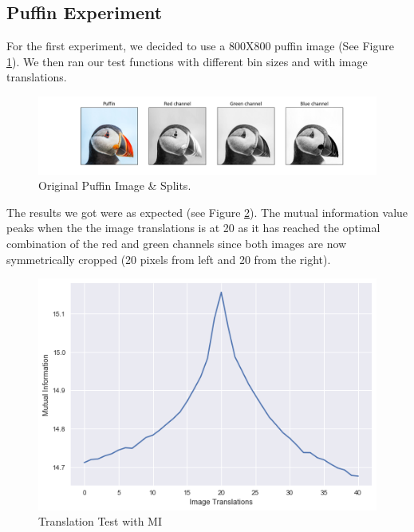\documentclass{article}
\begin{document}

\subsection{Puffin Experiment}
\vspace{2mm}

\begin{flushleft}
For the first experiment, we decided to use a 800X800 puffin image (See Figure \ref{fig:puffin_original}). We then ran our test functions with different bin sizes and with image translations.
\end{flushleft}

\begin{figure}[H]
    \centering
    \includegraphics[width=\linewidth]{experiments/puffin/RGB1-Puffin.png}
    \caption{Original Puffin Image \& Splits.}
    \label{fig:puffin_original}
\end{figure}

\begin{flushleft}
The results we got were as expected (see Figure \ref{fig:puffin_translations}). The mutual information value peaks when the the image translations is at 20 as it has reached the optimal combination of the red and green channels since both images are now symmetrically cropped (20 pixels from left and 20 from the right).
\end{flushleft}
\begin{figure}[H]
    \centering
    \includegraphics[width=\linewidth]{experiments/puffin/puffin-translations.png}
    \caption{Translation Test with MI }
    \label{fig:puffin_translations}
\end{figure}
\end{document}
